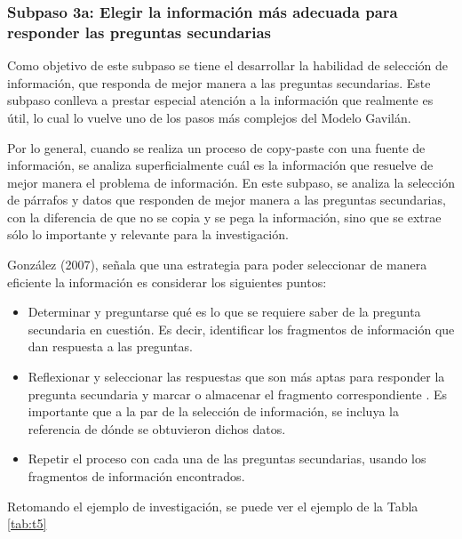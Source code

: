 
\subsubsection{Subpaso 3a: Elegir la información más adecuada para responder las preguntas secundarias}
\label{secPaso3aCap2}

Como objetivo de este subpaso se tiene el desarrollar la habilidad de selección de información, que responda de mejor manera a las preguntas secundarias. Este subpaso conlleva a prestar especial atención a la información que realmente es útil, lo cual lo vuelve uno de los pasos más complejos del Modelo Gavilán.

Por lo general, cuando se realiza un proceso de copy-paste con una fuente de información, se analiza superficialmente cuál es la información que resuelve de mejor manera el problema de información. En este subpaso, se analiza la selección de párrafos y datos que responden de mejor manera a las preguntas secundarias, con la diferencia de que no se copia y se pega la información, sino que se extrae sólo lo importante y relevante para la investigación.

González (2007), señala que una estrategia para poder seleccionar de manera eficiente la información es considerar los siguientes puntos:

\begin{itemize}
  \item Determinar y preguntarse qué es lo que se requiere saber de la pregunta secundaria en cuestión. Es decir, identificar los fragmentos de información que dan respuesta a las preguntas.
  \item Reflexionar y seleccionar las respuestas que son más aptas para responder la pregunta secundaria y marcar o almacenar el fragmento correspondiente . Es importante que a la par de la selección de información, se incluya la referencia de dónde se obtuvieron dichos datos.
  \item Repetir el proceso con cada una de las preguntas secundarias, usando los fragmentos de información encontrados.
\end{itemize}

Retomando el ejemplo de investigación, se puede ver el ejemplo de la Tabla \ref{tab:t5}

